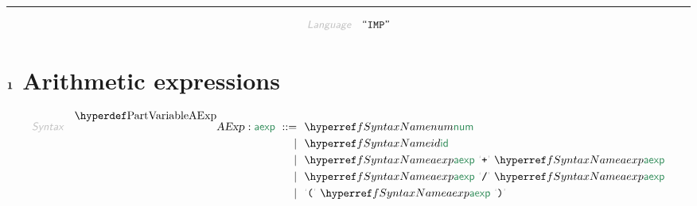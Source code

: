 

\begin{center}
\rule{3in}{0.4pt}
\end{center}

\begin{displaymath}
\KEY{Language} \quad \STRING{IMP}
\end{displaymath}

\section{$\SECT{1}$ Arithmetic expressions}\hypertarget{sect1-arithmetic-expressions}{}\label{sect1-arithmetic-expressions}

\begin{align*}
  \KEY{Syntax} \quad
    \VARDECL{AExp} : \SYN{aexp}
      \ ::= \ & \
      \SYNREF{num} \\
      \ \mid \ & \ \SYNREF{id} \\
      \ \mid \ & \ \SYNREF{aexp} \ \LEX{{+}} \ \SYNREF{aexp} \\
      \ \mid \ & \ \SYNREF{aexp} \ \LEX{{/}} \ \SYNREF{aexp} \\
      \ \mid \ & \ \LEX{{(}} \ \SYNREF{aexp} \ \LEX{{)}}
\end{align*}
